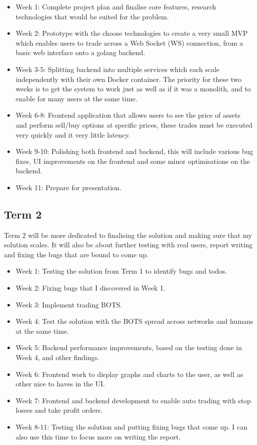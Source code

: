 \documentclass[titlepage]{article}
\begin{document}
\begin{itemize}
	\item Week 1: Complete project plan and finalise core features, research technologies that would be suited for the problem.
	\item Week 2: Prototype with the choose technologies to create a very small MVP which enables users to trade across a Web Socket (WS) connection, from a basic web interface onto a golang backend.
  \item Week 3-5: Splitting backend into multiple services which each scale independently with their own Docker container. The priority for these two weeks is to get the system to work just as well as if it was a monolith, and to enable for many users at the same time.
	\item Week 6-8: Frontend application that allows users to see the price of assets and perform sell/buy options at specific prices, these trades must be executed very quickly and it very little latency.
	\item Week 9-10: Polishing both frontend and backend, this will include various bug fixes, UI improvements on the frontend and some minor optimisations on the backend.
	\item Week 11: Prepare for presentation.
\end{itemize}

\subsection{Term 2}
Term 2 will be more dedicated to finalising the solution and making sure that my solution scales. It will also be about further testing with real users, report writing and fixing the bugs that are bound to come up.

\begin{itemize}
	\item Week 1: Testing the solution from Term 1 to identify bugs and todos.
	\item Week 2: Fixing bugs that I discovered in Week 1.
  \item Week 3: Implement trading BOTS.
  \item Week 4: Test the solution with the BOTS spread across networks and humans at the same time.
  \item Week 5: Backend performance improvements, based on the testing done in Week 4, and other findings.
  \item Week 6: Frontend work to display graphs and charts to the user, as well as other nice to haves in the UI.
	\item Week 7: Frontend and backend development to enable auto trading with stop losses and take profit orders.
  \item Week 8-11: Testing the solution and putting fixing bugs that come up. I can also use this time to focus more on writing the report.
\end{itemize}
\end{document}
